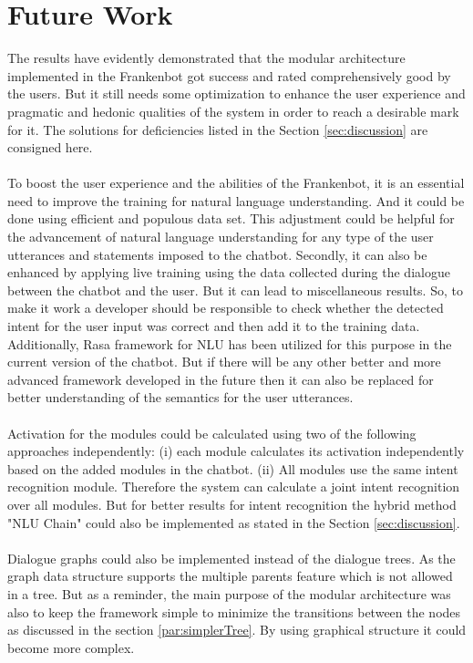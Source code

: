\section{Future Work}
The results have evidently demonstrated that the modular architecture implemented in the Frankenbot got success and rated comprehensively good by the users. But it still needs some optimization to enhance the user experience and pragmatic and hedonic qualities of the system in order to reach a desirable mark for it. The solutions for deficiencies listed in the Section \ref{sec:discussion} are consigned here.
\\~\\
To boost the user experience and the abilities of the Frankenbot, it is an essential need to improve the training for natural language understanding. And it could be done using efficient and populous data set. This adjustment could be helpful for the advancement of natural language understanding for any type of the user utterances and statements imposed to the chatbot. Secondly, it can also be enhanced by applying live training using the data collected during the dialogue between the chatbot and the user. But it can lead to miscellaneous results. So, to make it work a developer should be responsible to check whether the detected intent for the user input was correct and then add it to the training data. Additionally, Rasa framework for NLU has been utilized for this purpose in the current version of the chatbot. But if there will be any other better and more advanced framework developed in the future then it can also be replaced for better understanding of the semantics for the user utterances.
\\~\\
Activation for the modules could be calculated using two of the following approaches independently: (i) each module calculates its activation independently based on the added modules in the chatbot. (ii) All modules use the same intent recognition module. Therefore the system can calculate a joint intent recognition over all modules. But for better results for intent recognition the hybrid method "NLU Chain" could also be implemented as stated in the Section \ref{sec:discussion}. 
\\~\\
Dialogue graphs could also be implemented instead of the dialogue trees. As the graph data structure supports the multiple parents feature which is not allowed in a tree. But as a reminder, the main purpose of the modular architecture was also to keep the framework simple to minimize the transitions between the nodes as discussed in the section \ref{par:simplerTree}. By using graphical structure it could become more complex.
